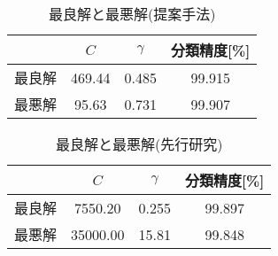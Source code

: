 \begin{table}[tb]
  \centering
  \caption{最良解と最悪解(提案手法)}  %
  \begin{tabular}{|c|c|c|c|}  %
      \hline  %
      &$C$ &$\gamma$ &分類精度[\%] \\  %
      \hline  %
    最良解&469.44&0.485&99.915\\  %
      \hline  %
    最悪解 &95.63 &0.731&99.907\\  %
      \hline  %
  \end{tabular}
  \label{myparam1}  %
\end{table}

\begin{table}[tb]
  \centering
  \caption{最良解と最悪解(先行研究)}  %
  \begin{tabular}{|c|c|c|c|}  %
      \hline  %
      &$C$ &$\gamma$ &分類精度[\%] \\  %
      \hline  %
    最良解 &7550.20& 0.255&99.897 \\  %
      \hline  %
    最悪解  &35000.00&15.81 &99.848\\  %
      \hline  %
  \end{tabular}
  \label{myparam2}  %
\end{table}




